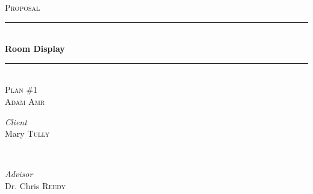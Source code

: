\documentclass[dvips,12pt]{article}
\begin{document}
\begin{titlepage} %
	\newcommand{\HRule}{\rule{\linewidth}{0.5mm}} %
	
	\center %
	
	
	\textsc{\LARGE Proposal}\\[1.5cm] %
		
	\HRule\\[0.4cm]
	
	{\huge\bfseries Room Display}\\[0.4cm] %
	
	\HRule\\[1.5cm]
	
	
	\textsc{\Large Plan \#1}\\[0.5cm] %
	
	\textsc{\large Adam Amr}\\[0.5cm] %
	
	
	\begin{minipage}{0.4\textwidth}
		\begin{flushleft}
			\large
			\textit{Client}\\
			Mary \textsc{Tully} %
		\end{flushleft}
	\end{minipage}
	~
	\begin{minipage}{0.4\textwidth}
		\begin{flushright}
			\large
			\textit{Advisor}\\
			Dr. Chris \textsc{Reedy} %
		\end{flushright}
	\end{minipage}
	
	
	

\end{titlepage}
\end{document}
